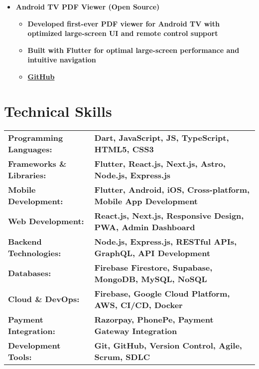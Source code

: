 \documentclass[letterpaper,11pt]{article}
\newcommand{\resumeItem}[1]{\item\small{\bfseries\color{textblack}#1}\vspace{-2pt}}
\renewcommand{\textbf}[1]{{\bfseries\color{headingblack}#1}}
\renewcommand{\textit}[1]{{\itshape\bfseries\color{textblack}#1}}
\begin{document}
\begin{itemize}[leftmargin=*]
\vspace{1.5mm}

    \item \textbf{Android TV PDF Viewer (Open Source)} \hfill \bfseries\color{textblack}\textit{Flutter}
    \begin{itemize}[leftmargin=*]
        \resumeItem{Developed first-ever PDF viewer for Android TV with optimized large-screen UI and remote control support}
        \resumeItem{Built with Flutter for optimal large-screen performance and intuitive navigation}
        \resumeItem{\textbf{Links:} \href{https://github.com/pawan-joshee/android_tv_pdf_viewer}{\color{linkblue}GitHub}}
    \end{itemize}
\end{itemize}

\vspace{2mm}

\section{Technical Skills}
\begin{tabular*}{\textwidth}{@{\extracolsep{\fill}}ll}
\textbf{Programming Languages:} & \bfseries\color{textblack}Dart, JavaScript, JS, TypeScript, HTML5, CSS3 \\
\textbf{Frameworks \& Libraries:} & \bfseries\color{textblack}Flutter, React.js, Next.js, Astro, Node.js, Express.js \\
\textbf{Mobile Development:} & \bfseries\color{textblack}Flutter, Android, iOS, Cross-platform, Mobile App Development \\
\textbf{Web Development:} & \bfseries\color{textblack}React.js, Next.js, Responsive Design, PWA, Admin Dashboard \\
\textbf{Backend Technologies:} & \bfseries\color{textblack}Node.js, Express.js, RESTful APIs, GraphQL, API Development \\
\textbf{Databases:} & \bfseries\color{textblack}Firebase Firestore, Supabase, MongoDB, MySQL, NoSQL \\
\textbf{Cloud \& DevOps:} & \bfseries\color{textblack}Firebase, Google Cloud Platform, AWS, CI/CD, Docker \\
\textbf{Payment Integration:} & \bfseries\color{textblack}Razorpay, PhonePe, Payment Gateway Integration \\
\textbf{Development Tools:} & \bfseries\color{textblack}Git, GitHub, Version Control, Agile, Scrum, SDLC
\end{tabular*}
\end{document}
